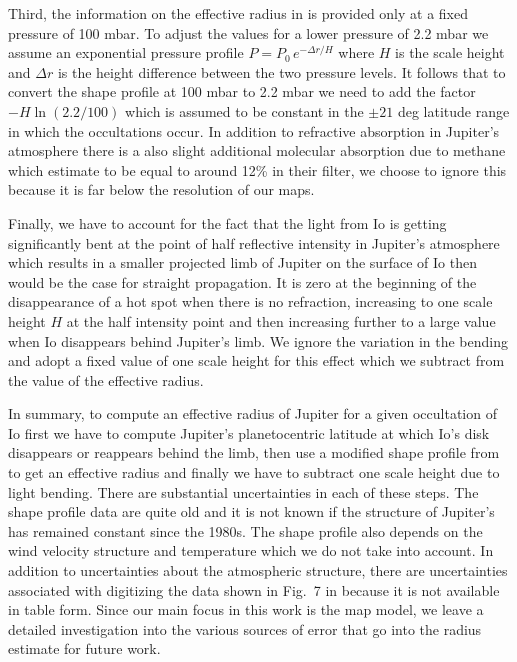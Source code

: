 \documentclass[modern]{aastex62}
\begin{document}
%

Third, the information on the effective radius in \cite{lindal1981} is provided only at a fixed pressure of 100 mbar.
To adjust the values for a lower pressure of 2.2 mbar we assume an exponential pressure profile $P=P_0\, e^{-\Delta r/H}$ where $H$ is the scale height and $\Delta r$ is the height difference between the two pressure levels.
It follows that to convert the shape profile at 100 mbar to 2.2 mbar we need to add the factor
$-H\ln(2.2/100)$ which is assumed to be constant in the $\pm 21$ deg latitude range in which the occultations occur.
In addition to refractive absorption in Jupiter's atmosphere there is a also slight additional molecular absorption due to methane which \cite{spencer1990} estimate to be equal to around 12\% in their filter, we choose to ignore this because it is far below the resolution of our maps.

Finally, we have to account for the fact that the light from Io is getting significantly bent at the point of half reflective intensity in Jupiter's atmosphere which results in a smaller projected limb of Jupiter on the surface of Io then would be the case for straight propagation.
It is zero at the beginning of the disappearance of a hot spot when there is no refraction, increasing to one scale height $H$ at the half intensity point and then increasing further to a large value when Io disappears behind Jupiter's limb.
We ignore the variation in the bending and adopt a fixed value of one scale height for this effect which we subtract from the value of the effective radius.

In summary, to compute an effective radius of Jupiter for a given occultation of Io first we have to compute Jupiter's planetocentric latitude at which Io's disk disappears or reappears behind the limb, then use a modified shape profile from \cite{lindal1981} to get an effective radius and finally we have to subtract one scale height due to light bending.
There are substantial uncertainties in each of these steps.
The shape profile data are quite old and it is not known if the structure of Jupiter's has remained constant since the 1980s. 
The shape profile also depends on the wind velocity structure and temperature which we do not take into account.
In addition to uncertainties about the atmospheric structure, there are uncertainties associated with digitizing the data shown in Fig.~7 in \cite{lindal1981} because it is not available in table form.
Since our main focus in this work is the map model, we leave a detailed investigation into the various sources of error that go into the radius estimate for future work.
\end{document}
